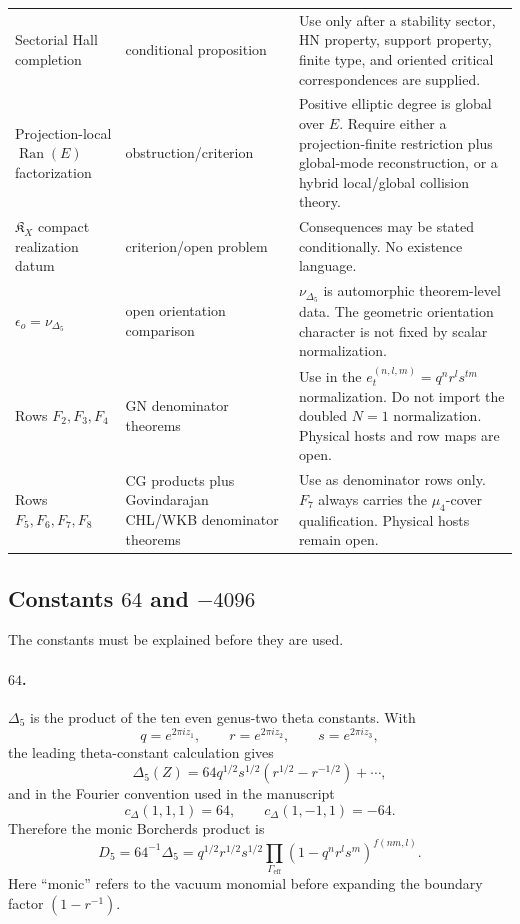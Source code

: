 \begin{center}
\begin{tabular}{p{}p{}p{}}
Sectorial Hall completion &
conditional proposition &
Use only after a stability sector, HN property, support property,
finite type, and oriented critical correspondences are supplied. \\
Projection-local \(\operatorname{Ran}(E)\) factorization &
obstruction/criterion &
Positive elliptic degree is global over \(E\).  Require either a
projection-finite restriction plus global-mode reconstruction, or a
hybrid local/global collision theory. \\
\(\mathfrak K_X\) compact realization datum &
criterion/open problem &
Consequences may be stated conditionally.  No existence language. \\
\(\epsilon_o=\nu_{\Delta_5}\) &
open orientation comparison &
\(\nu_{\Delta_5}\) is automorphic theorem-level data.  The geometric
orientation character is not fixed by scalar normalization. \\
Rows \(F_2,F_3,F_4\) &
GN denominator theorems &
Use in the \(e_t^{(n,l,m)}=q^nr^ls^{tm}\) normalization.  Do not import
the doubled \(N=1\) normalization.  Physical hosts and row maps are
open. \\
Rows \(F_5,F_6,F_7,F_8\) &
CG products plus Govindarajan CHL/WKB denominator theorems &
Use as denominator rows only.  \(F_7\) always carries the
\(\mu_4\)-cover qualification.  Physical hosts remain open. \\
\hline
\end{tabular}
\end{center}

\subsection{Constants \(64\) and \(-4096\)}

The constants must be explained before they are used.

\paragraph{\(64\).}
\(\Delta_5\) is the product of the ten even genus-two theta constants.
With
\[
q=e^{2\pi iz_1},\qquad r=e^{2\pi iz_2},\qquad s=e^{2\pi iz_3},
\]
the leading theta-constant calculation gives
\[
\Delta_5(Z)=64q^{1/2}s^{1/2}(r^{1/2}-r^{-1/2})+\cdots,
\]
and in the Fourier convention used in the manuscript
\[
c_\Delta(1,1,1)=64,\qquad c_\Delta(1,-1,1)=-64.
\]
Therefore the monic Borcherds product is
\[
D_5=64^{-1}\Delta_5
=q^{1/2}r^{1/2}s^{1/2}
\prod_{\Gamma_{\mathrm{eff}}}(1-q^nr^ls^m)^{f(nm,l)}.
\]
Here ``monic'' refers to the vacuum monomial before expanding the
boundary factor \((1-r^{-1})\).

